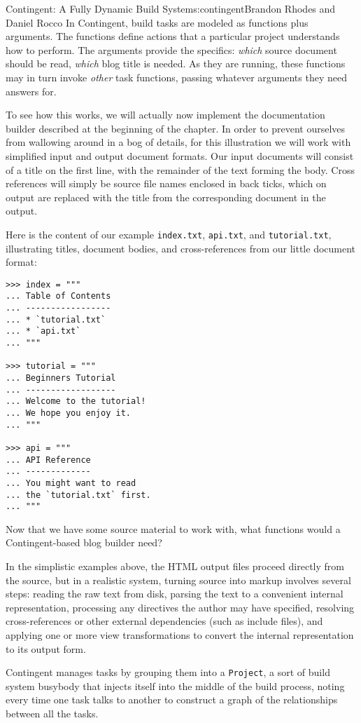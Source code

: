 \begin{aosachapter}{Contingent: A Fully Dynamic Build System}{s:contingent}{Brandon Rhodes and Daniel Rocco}
In Contingent, build tasks are modeled as functions plus arguments. The
functions define actions that a particular project understands how to
perform. The arguments provide the specifics: \emph{which} source
document should be read, \emph{which} blog title is needed. As they are
running, these functions may in turn invoke \emph{other} task functions,
passing whatever arguments they need answers for.

To see how this works, we will actually now implement the documentation
builder described at the beginning of the chapter. In order to prevent
ourselves from wallowing around in a bog of details, for this
illustration we will work with simplified input and output document
formats. Our input documents will consist of a title on the first line,
with the remainder of the text forming the body. Cross references will
simply be source file names enclosed in back ticks, which on output are
replaced with the title from the corresponding document in the output.

Here is the content of our example \texttt{index.txt}, \texttt{api.txt},
and \texttt{tutorial.txt}, illustrating titles, document bodies, and
cross-references from our little document format:

\begin{verbatim}
>>> index = """
... Table of Contents
... -----------------
... * `tutorial.txt`
... * `api.txt`
... """

>>> tutorial = """
... Beginners Tutorial
... ------------------
... Welcome to the tutorial!
... We hope you enjoy it.
... """

>>> api = """
... API Reference
... -------------
... You might want to read
... the `tutorial.txt` first.
... """
\end{verbatim}

Now that we have some source material to work with, what functions would
a Contingent-based blog builder need?

In the simplistic examples above, the HTML output files proceed directly
from the source, but in a realistic system, turning source into markup
involves several steps: reading the raw text from disk, parsing the text
to a convenient internal representation, processing any directives the
author may have specified, resolving cross-references or other external
dependencies (such as include files), and applying one or more view
transformations to convert the internal representation to its output
form.

Contingent manages tasks by grouping them into a \texttt{Project}, a
sort of build system busybody that injects itself into the middle of the
build process, noting every time one task talks to another to construct
a graph of the relationships between all the tasks.


\end{aosachapter}
